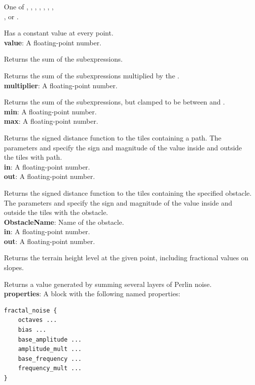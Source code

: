 One of , , , , , , ,\\, or .

Has a constant value at every point.\\
\textbf{value}: A floating-point number.

Returns the sum of the subexpressions.

Returns the sum of the subexpressions multiplied by the .\\
\textbf{multiplier}: A floating-point number.

Returns the sum of the subexpressions, but clamped to be between  and .\\
\textbf{min}: A floating-point number.\\
\textbf{max}: A floating-point number.

Returns the signed distance function to the tiles containing a path.
The parameters  and  specify the sign and magnitude of the value inside and outside the tiles with path.\\
\textbf{in}: A floating-point number.\\
\textbf{out}: A floating-point number.

Returns the signed distance function to the tiles containing the specified obstacle.
The parameters  and  specify the sign and magnitude of the value inside and outside the tiles with the obstacle.\\
\textbf{ObstacleName}: Name of the obstacle.\\
\textbf{in}: A floating-point number.\\
\textbf{out}: A floating-point number.

Returns the terrain height level at the given point, including fractional values on slopes.

Returns a value generated by summing several layers of Perlin noise.\\
\textbf{properties}: A block with the following named properties:
\begin{verbatim}
fractal_noise {
    octaves ...
    bias ...
    base_amplitude ...
    amplitude_mult ...
    base_frequency ...
    frequency_mult ...
}
\end{verbatim}

